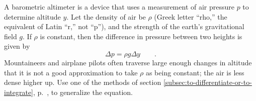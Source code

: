 A barometric altimeter is a device that uses a measurement of air pressure $p$ to determine
altitude $y$. Let the density of air be $\rho$ (Greek letter ``rho,'' the equivalent of Latin ``r,'' not
``p''), and the strength of the earth's gravitational field $g$. If $\rho$ is constant, then the
difference in pressure between two heights is given by
\begin{equation*}
  \Delta p = \rho g \Delta y \qquad .
\end{equation*}
Mountaineers and airplane pilots often traverse large enough changes in altitude that it is not
a good approximation to take $\rho$ as being constant; the air is less dense higher up.
Use one of the methods of section \ref{subsec:to-differentiate-or-to-integrate},
p.~\pageref{to-differentiate-or-to-integrate}, to generalize the equation.
